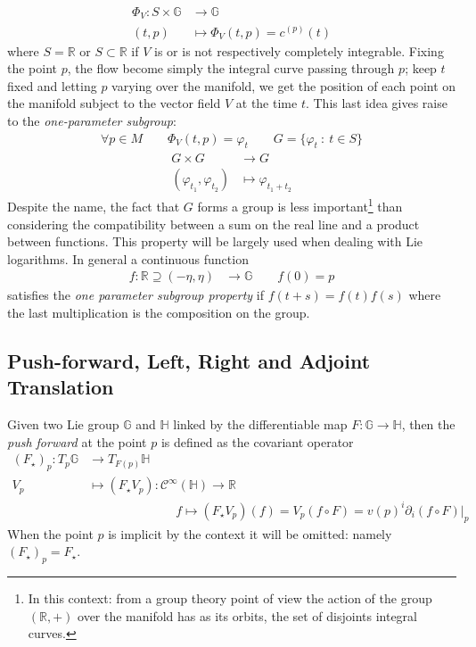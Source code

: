 \begin{align*}
\Phi_{V}: S\times \mathbb{G} &\longrightarrow \mathbb{G}   \\
(t,p) &\longmapsto  \Phi_{V}(t,p) = c^{(p)}(t)
\end{align*}
where $S = \mathbb{R} $ or $S\subset \mathbb{R}$ if $V$ is or is not respectively completely integrable. Fixing the point $p$, the flow become simply the integral curve passing through $p$; keep $t$ fixed and letting $p$ varying over the manifold, we get the position of each point on the manifold subject to the vector field $V$ at the time $t$. This last idea gives raise to the \emph{one-parameter subgroup}:
\begin{align*}
\forall p \in M \qquad \Phi_{V}(t,p) = \varphi_{t}  \qquad G = \{ \varphi_{t} ~:~ t \in S\}
\end{align*}
\begin{align*}
G\times G &\longrightarrow G   \\
(\varphi_{t_1} ,\varphi_{t_2} ) &\longmapsto  \varphi_{t_1 + t_2} 
\end{align*}
Despite the name, the fact that $G$ forms a group is less important\footnote{In this context: from a group theory point of view the action of the group $(\mathbb{R},+)$ over the manifold has as its orbits, the set of disjoints integral curves.} than considering the compatibility between a sum on the real line and a product between functions. This property will be largely used when dealing with Lie logarithms.
In general a continuous function
\begin{align*}
f : \mathbb{R}\supseteq (-\eta,\eta) & \longrightarrow \mathbb{G}  \qquad f(0) = p
\end{align*}
satisfies the \emph{one parameter subgroup property} if $f(t+s) = f(t) f(s)$ where the last multiplication is the composition on the group. 

\subsection{Push-forward, Left, Right and Adjoint Translation}

Given two Lie group $\mathbb{G}$ and $\mathbb{H}$ linked by the differentiable map $F:\mathbb{G}\rightarrow \mathbb{H}$, then the \emph{push forward} at the point $p$ is defined as the covariant operator
\begin{align*}
(F_{\star})_{p} : T_{p} \mathbb{G} & \longrightarrow  T_{F(p)}\mathbb{H}   \\
V_{p}  &\longmapsto  (F_{\star} V_{p})  : \mathcal{C}^{\infty}(\mathbb{H})  \longrightarrow   \mathbb{R} \\
& \qquad \qquad \qquad \quad f \longmapsto (F_{\star} V_{p})(f) = V_{p}(f\circ F) 
=
v(p)^{i} \partial_{i}(f\circ F)\bigr|_{p} 
\end{align*}
When the point $p$ is implicit by the context it will be omitted: namely $(F_{\star})_{p} = F_{\star}$. \\

